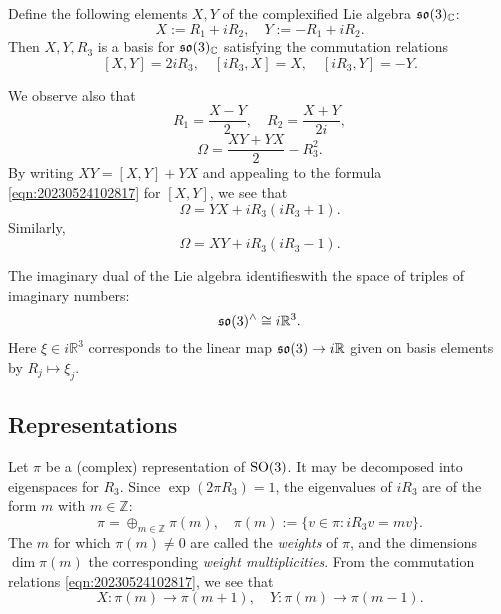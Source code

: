 \documentclass[reqno]{amsart} 
\numberwithin{equation}{section}
\numberwithin{theorem}{section}
\begin{document}
Define the following elements $X,Y$ of the complexified Lie algebra $\operatorname{\mathfrak{s}\mathfrak{o}}(3)_{\mathbb{C}}$:
\begin{equation*}
  X := R_1 + i R_2,
  \quad
  Y := -R_1 + i R_2.
\end{equation*}
Then $X,Y,R_3$ is a basis for $\operatorname{\mathfrak{s}\mathfrak{o}}(3)_{\mathbb{C}}$ satisfying the commutation relations
\begin{equation}\label{eqn:20230524102817} [X,Y] = 2 i R_3,
  \quad
  [i R_3, X] = X,
  \quad
  [i R_3, Y] = - Y.
\end{equation}

We observe also that
\begin{equation*}
  R_1 = \frac{X - Y}{2},
  \quad
  R_2 = \frac{X + Y}{2 i},
\end{equation*}
\begin{equation*}
  \Omega =
  \frac{X Y + Y X}{2} - R_3^2.
\end{equation*}
By writing $X Y = [X,Y] + Y X$ and appealing to the formula \eqref{eqn:20230524102817} for $[X,Y]$, we see that
\begin{equation}\label{eqn:20230524102839}
  \Omega = Y X +  i R_3(i R_3 + 1).
\end{equation}
Similarly,
\begin{equation}\label{eqn:20230524104145}
  \Omega = X Y  + i R_3 (i R_3 - 1).
\end{equation}

The imaginary dual of the Lie algebra identifieswith the space of triples of imaginary numbers:
\begin{equation}\label{eqn:d1a914f48fd7}
\operatorname{\mathfrak{s}\mathfrak{o}}(3)^\wedge \cong  i \mathbb{R}^3.
\end{equation}
Here $\xi \in i \mathbb{R}^3$ corresponds to the linear map $\operatorname{\mathfrak{s}\mathfrak{o}}(3) \rightarrow i \mathbb{R}$ given on basis elements by $R_j \mapsto \xi_j$.

\subsection{Representations}\label{sec:d1a9162ec67d}
Let $\pi$ be a (complex) representation of $\operatorname{SO}(3)$.  It may be decomposed into eigenspaces for $R_3$.  Since $\exp(2 \pi R_3) = 1$, the eigenvalues of $i R_3$ are of the form $m$ with $m \in \mathbb{Z}$:
\begin{equation*}
  \pi = \oplus_{m \in \mathbb{Z}} \pi(m),
  \quad
  \pi(m) := \{ v \in \pi : i R_3 v = m v \}.
\end{equation*}
The $m$ for which $\pi(m) \neq 0$ are called the \emph{weights} of $\pi$, and the dimensions $\dim \pi(m)$ the corresponding \emph{weight multiplicities}.
From the commutation relations \eqref{eqn:20230524102817}, we see that
\begin{equation}\label{eqn:20230524104326}
  X : \pi(m) \rightarrow \pi(m+1),
  \quad
  Y : \pi(m) \rightarrow \pi(m-1).
\end{equation}
\end{document}
